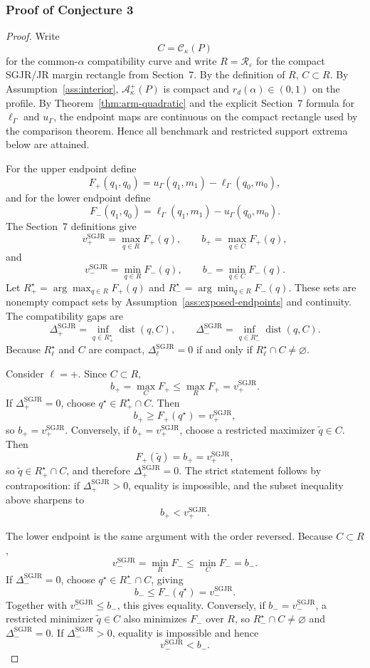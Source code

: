 \documentclass[11pt]{article}
\theoremstyle{definition}
\theoremstyle{plain}
\theoremstyle{remark}
\begin{document}
\subsubsection*{Proof of Conjecture 3}
\begin{proof}
Write
\[
  C=\mathcal C_\kappa(P)
\]
for the common-\(\alpha\) compatibility curve and write \(R=\mathcal R_\varepsilon\)
for the compact SGJR/JR margin rectangle from Section~7.  By the definition of
\(R\), \(C\subset R\).  By Assumption~\ref{ass:interior},
\(\mathcal A_\kappa^+(P)\) is compact and \(r_d(\alpha)\in(0,1)\) on the
profile.  By Theorem~\ref{thm:arm-quadratic} and the explicit Section~7 formula
for \(\ell_\Gamma\) and \(u_\Gamma\), the endpoint maps are continuous on the
compact rectangle used by the comparison theorem.  Hence all benchmark and
restricted support extrema below are attained.

For the upper endpoint define
\[
  F_+(q_1,q_0)=u_\Gamma(q_1,m_1)-\ell_\Gamma(q_0,m_0),
\]
and for the lower endpoint define
\[
  F_-(q_1,q_0)=\ell_\Gamma(q_1,m_1)-u_\Gamma(q_0,m_0).
\]
The Section~7 definitions give
\[
  v_+^{\mathrm{SGJR}}=\max_{q\in R}F_+(q),\qquad
  b_+=\max_{q\in C}F_+(q),
\]
and
\[
  v_-^{\mathrm{SGJR}}=\min_{q\in R}F_-(q),\qquad
  b_-=\min_{q\in C}F_-(q).
\]
Let \(R_+^\star=\arg\max_{q\in R}F_+(q)\) and
\(R_-^\star=\arg\min_{q\in R}F_-(q)\).  These sets are nonempty compact sets by
Assumption~\ref{ass:exposed-endpoints} and continuity.  The compatibility gaps
are
\[
  \Delta_+^{\mathrm{SGJR}}=\inf_{q\in R_+^\star}\operatorname{dist}(q,C),
  \qquad
  \Delta_-^{\mathrm{SGJR}}=\inf_{q\in R_-^\star}\operatorname{dist}(q,C).
\]
Because \(R_\ell^\star\) and \(C\) are compact,
\(\Delta_\ell^{\mathrm{SGJR}}=0\) if and only if
\(R_\ell^\star\cap C\ne\varnothing\).

Consider \(\ell=+\).  Since \(C\subset R\),
\[
  b_+=\max_C F_+\le \max_R F_+=v_+^{\mathrm{SGJR}}.
\]
If \(\Delta_+^{\mathrm{SGJR}}=0\), choose \(q^\star\in R_+^\star\cap C\).
Then
\[
  b_+\ge F_+(q^\star)=v_+^{\mathrm{SGJR}},
\]
so \(b_+=v_+^{\mathrm{SGJR}}\).  Conversely, if
\(b_+=v_+^{\mathrm{SGJR}}\), choose a restricted maximizer \(\tilde q\in C\).
Then
\[
  F_+(\tilde q)=b_+=v_+^{\mathrm{SGJR}},
\]
so \(\tilde q\in R_+^\star\cap C\), and therefore
\(\Delta_+^{\mathrm{SGJR}}=0\).  The strict statement follows by
contraposition: if \(\Delta_+^{\mathrm{SGJR}}>0\), equality is impossible, and
the subset inequality above sharpens to
\[
  b_+<v_+^{\mathrm{SGJR}}.
\]

The lower endpoint is the same argument with the order reversed.  Because
\(C\subset R\),
\[
  v_-^{\mathrm{SGJR}}=\min_R F_-\le \min_C F_-=b_-.
\]
If \(\Delta_-^{\mathrm{SGJR}}=0\), choose \(q^\star\in R_-^\star\cap C\),
giving
\[
  b_-\le F_-(q^\star)=v_-^{\mathrm{SGJR}}.
\]
Together with \(v_-^{\mathrm{SGJR}}\le b_-\), this gives equality.
Conversely, if \(b_-=v_-^{\mathrm{SGJR}}\), a restricted minimizer
\(\tilde q\in C\) also minimizes \(F_-\) over \(R\), so
\(R_-^\star\cap C\ne\varnothing\) and \(\Delta_-^{\mathrm{SGJR}}=0\).  If
\(\Delta_-^{\mathrm{SGJR}}>0\), equality is impossible and hence
\[
  v_-^{\mathrm{SGJR}}<b_-.
\]


\end{proof}
\end{document}

